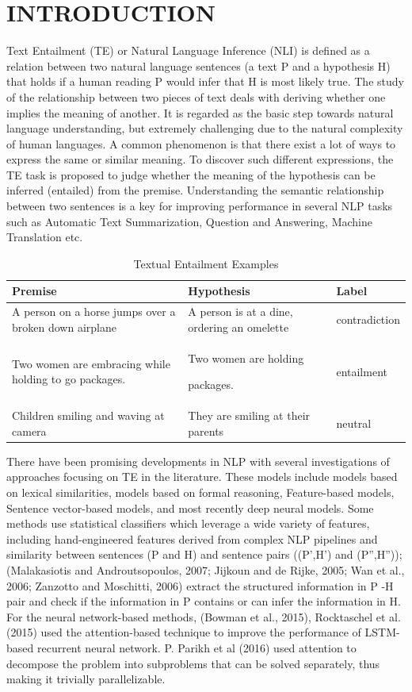 \documentclass[runningheads]{llncs}
\begin{document}
\section{INTRODUCTION}
Text Entailment (TE) or Natural Language Inference (NLI) is defined as a relation between two natural language sentences (a text P and a hypothesis H) that holds if a human reading P would infer that H is most likely true. The study of the relationship between two pieces of text deals with deriving whether one implies the meaning of another. It is regarded as the basic step towards natural language understanding, but extremely challenging due to the natural complexity of human languages. A common phenomenon is that there exist a lot of ways to express the same or similar meaning. To discover such different expressions, the TE task is proposed to judge whether the meaning of the hypothesis can be inferred (entailed) from the premise. Understanding the semantic relationship between two sentences is a key for improving performance in several NLP tasks such as Automatic Text Summarization, Question and Answering, Machine Translation etc. 
\begin{table}
	\caption{Textual Entailment Examples}\label{tab1}
	\begin{tabular}{|l|l|l|}
		\hline
		 {\Large\bfseries Premise} &  {\Large\bfseries Hypothesis} &  {\Large\bfseries Label}\\
		\hline
		A person on a horse jumps over a broken down airplane &  A person is at a dine, 
		ordering an omelette
& contradiction\\
		Two women are embracing while holding to go packages. &  Two women are holding 

		packages.
& entailment\\
		Children smiling and waving at camera &They are smiling at their parents &neutral\\
		\hline
	\end{tabular}
\end{table}
There have been promising developments in NLP with several investigations of approaches focusing on TE in the literature. These models include models based on lexical similarities, models based on formal reasoning, Feature-based models, Sentence vector-based models,
and most recently deep neural models.  Some methods use statistical classifiers which leverage a wide variety of features, including hand-engineered features derived from complex NLP pipelines
and similarity between sentences (P and H) and sentence pairs ((P',H') and (P'',H'')); (Malakasiotis and Androutsopoulos, 2007; Jijkoun and de Rijke, 2005; Wan et al., 2006; Zanzotto and Moschitti, 2006) extract the structured information in P -H pair and check if the information in P contains or can infer the information in H. For the neural network-based methods, (Bowman et al., 2015), Rocktaschel et al. (2015) used the attention-based technique to improve the performance of LSTM-based recurrent neural network. P. Parikh et al (2016) used attention to decompose the problem into subproblems that can be solved separately, thus making it trivially parallelizable.
\end{document}
